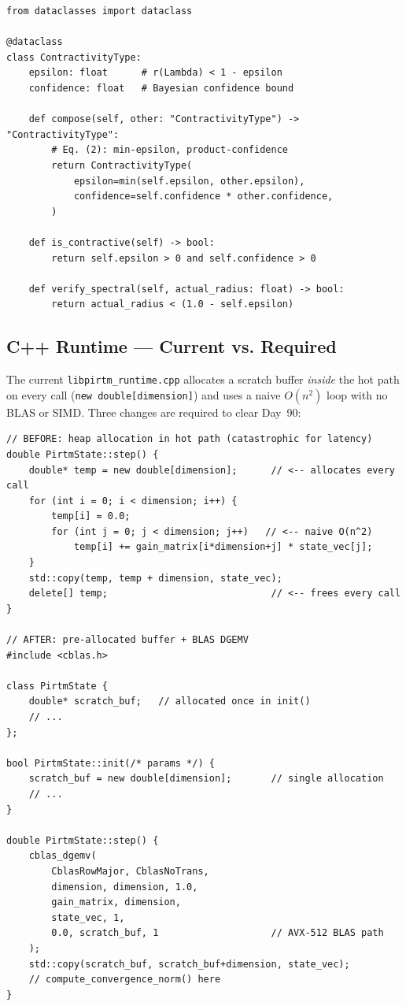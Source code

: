 \documentclass[11pt,letterpaper]{article}
\theoremstyle{remark}
\begin{document}
\begin{lstlisting}[style=python, caption={ContractivityType and composition algebra}]
from dataclasses import dataclass

@dataclass
class ContractivityType:
    epsilon: float      # r(Lambda) < 1 - epsilon
    confidence: float   # Bayesian confidence bound

    def compose(self, other: "ContractivityType") -> "ContractivityType":
        # Eq. (2): min-epsilon, product-confidence
        return ContractivityType(
            epsilon=min(self.epsilon, other.epsilon),
            confidence=self.confidence * other.confidence,
        )

    def is_contractive(self) -> bool:
        return self.epsilon > 0 and self.confidence > 0

    def verify_spectral(self, actual_radius: float) -> bool:
        return actual_radius < (1.0 - self.epsilon)
\end{lstlisting}

\subsection{C++ Runtime --- Current vs. Required}

The current \texttt{libpirtm\_runtime.cpp} allocates a scratch buffer
\emph{inside} the hot path on every call (\texttt{new double[dimension]})
and uses a naive $O(n^2)$ loop with no BLAS or SIMD. Three changes are
required to clear Day~90:

\begin{lstlisting}[style=cpp, caption={Required C++ runtime changes for Day 90 clearance}]
// BEFORE: heap allocation in hot path (catastrophic for latency)
double PirtmState::step() {
    double* temp = new double[dimension];      // <-- allocates every call
    for (int i = 0; i < dimension; i++) {
        temp[i] = 0.0;
        for (int j = 0; j < dimension; j++)   // <-- naive O(n^2)
            temp[i] += gain_matrix[i*dimension+j] * state_vec[j];
    }
    std::copy(temp, temp + dimension, state_vec);
    delete[] temp;                             // <-- frees every call
}

// AFTER: pre-allocated buffer + BLAS DGEMV
#include <cblas.h>

class PirtmState {
    double* scratch_buf;   // allocated once in init()
    // ...
};

bool PirtmState::init(/* params */) {
    scratch_buf = new double[dimension];       // single allocation
    // ...
}

double PirtmState::step() {
    cblas_dgemv(
        CblasRowMajor, CblasNoTrans,
        dimension, dimension, 1.0,
        gain_matrix, dimension,
        state_vec, 1,
        0.0, scratch_buf, 1                    // AVX-512 BLAS path
    );
    std::copy(scratch_buf, scratch_buf+dimension, state_vec);
    // compute_convergence_norm() here
}
\end{lstlisting}
\end{document}
